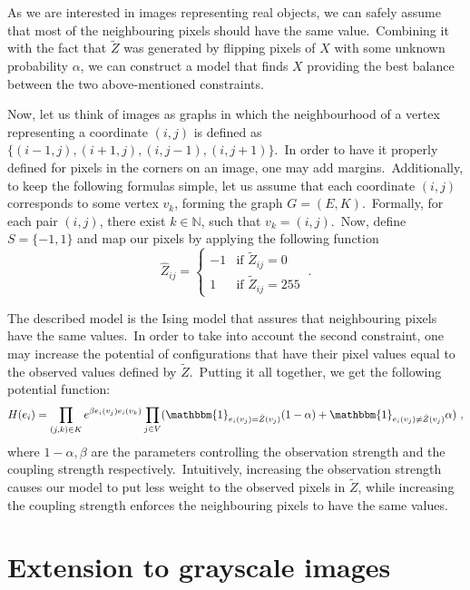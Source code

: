 \documentclass[shortabstract, english, lic]{iithesis}
\theoremstyle{default_theorem_style}\newtheorem{theorem}{Theorem}
\theoremstyle{default_theorem_style}\newtheorem{definition}{Definition}
\begin{document}
\noindent As we are interested in images representing real objects, we can safely assume that most of the neighbouring
pixels should have the same value.\ Combining it with the fact that $\tilde{Z}$ was generated by flipping pixels of
$X$ with some unknown probability $\alpha$, we can construct a model that finds $X$ providing the best balance between the
two above-mentioned constraints.\newline

\noindent Now, let us think of images as graphs in which the neighbourhood of a vertex representing a
coordinate $(i, j)$ is defined as $\{(i - 1, j), (i + 1, j), (i, j - 1), (i, j + 1)\}$.\ In
order to have it properly defined for pixels in the corners on an image, one may add margins.\ Additionally, to keep
the following formulas simple, let us assume that each coordinate $(i, j)$ corresponds to some
vertex $v_k$, forming the graph $G = (E, K)$.\ Formally, for each pair $(i, j)$, there exist
$k \in \mathbb{N}$, such that $v_k = (i, j)$.\ Now, define $S = \{-1, 1\}$ and map our pixels by applying the
following function
$$
\hat{Z}_{ij} =
\begin{cases}
  -1 &\text{if $\tilde{Z}_{ij} = 0$}\\
  1 &\text{if $\tilde{Z}_{ij} = 255$}
\end{cases}\ .
$$

\noindent The described model is the Ising model that assures that neighbouring pixels have the same values.\ In order
to take into account the second constraint, one may increase the potential of configurations that have their pixel
values equal to the observed values defined by $\tilde{Z}$.\ Putting it all together, we get the following potential
function:
$$
H(e_i) = \prod\limits_{(j, k) \in K} e^{\beta e_i(v_j)e_i(v_k)}
\prod\limits_{j \in V}(\mathbbm{1}_{e_i(v_j) = \hat{Z}(v_j)}(1 - \alpha) +
\mathbbm{1}_{e_i(v_j) \neq \hat{Z}(v_j)}\alpha)\ ,
$$
where $1 - \alpha, \beta$ are the parameters controlling the observation strength and the coupling strength
respectively.\ Intuitively, increasing the observation strength causes our model to put less weight to the
observed pixels in $\tilde{Z}$, while increasing the coupling strength enforces the neighbouring pixels to have the
same values.

\section{Extension to grayscale images}
\end{document}
